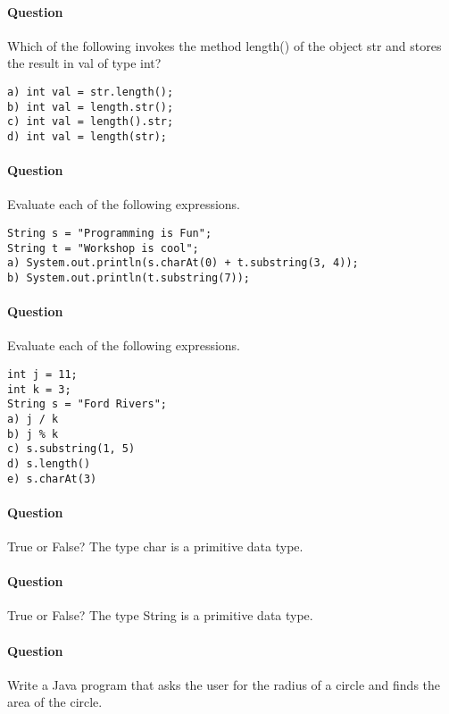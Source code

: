 \documentclass{article}
\begin{document}
\addtocounter{question_num}{1}
\paragraph{Question }
Which of the following invokes the method length() of the object str and stores the result in val of type int?
\begin{lstlisting}
a) int val = str.length();
b) int val = length.str();
c) int val = length().str;
d) int val = length(str);
\end{lstlisting}

\addtocounter{question_num}{1}
\paragraph{Question }
Evaluate each of the following expressions.
\begin{lstlisting}
String s = "Programming is Fun";
String t = "Workshop is cool";
a) System.out.println(s.charAt(0) + t.substring(3, 4));
b) System.out.println(t.substring(7));
\end{lstlisting}

\addtocounter{question_num}{1}
\paragraph{Question }
Evaluate each of the following expressions.
\begin{lstlisting}
int j = 11;
int k = 3;
String s = "Ford Rivers";
a) j / k
b) j % k
c) s.substring(1, 5)
d) s.length()
e) s.charAt(3)
\end{lstlisting}

\addtocounter{question_num}{1}
\paragraph{Question }
True or False? The type char is a primitive data type.

\addtocounter{question_num}{1}
\paragraph{Question }
True or False? The type String is a primitive data type.

\addtocounter{question_num}{1}
\paragraph{Question }
Write a Java program that asks the user for the radius of a circle and finds the area of the circle.
\end{document}
